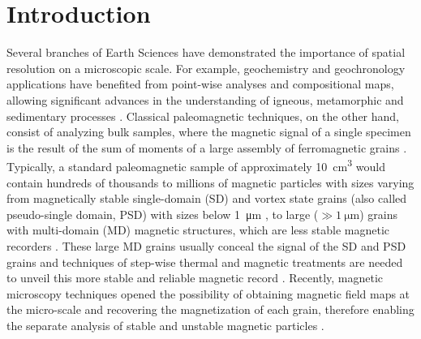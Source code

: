 \section{Introduction}

Several branches of Earth Sciences have demonstrated the importance of spatial resolution on a microscopic scale. For example, geochemistry and
geochronology applications have benefited from point-wise analyses
and compositional maps, allowing significant advances in the understanding of
igneous, metamorphic and sedimentary processes \citep{Verberne2020, Barnes2019,
Davidson2007}. Classical paleomagnetic techniques, on the other hand, consist
of analyzing bulk samples, where the magnetic signal of a single specimen is
the result of the sum of moments of a large assembly of ferromagnetic grains
\citep{Dunlop1997}. Typically, a standard paleomagnetic sample of
approximately \qty{10}{\cm\cubed} would contain hundreds of thousands
to millions of magnetic particles with sizes varying from magnetically stable
single-domain (SD) and vortex state grains (also called pseudo-single domain,
PSD) with sizes below \qty{1}{\um} \citep{Berndt2016}, to large ($\gg \qty{1}{\um}$) grains with
multi-domain (MD) magnetic structures, which are less stable magnetic recorders \citep{Dunlop1997}.
These large MD grains usually conceal the signal of the SD
and PSD grains and techniques of step-wise thermal and magnetic treatments are
needed to unveil this more stable and reliable magnetic record
\citep{Tauxe2018}. Recently, magnetic microscopy techniques opened the
possibility of obtaining magnetic field maps at the micro-scale and recovering the
magnetization of each grain, therefore enabling the separate analysis of stable
and unstable magnetic particles \citep{DeGroot2018, Lima2014, Weiss2007,
DeGroot2014}.

